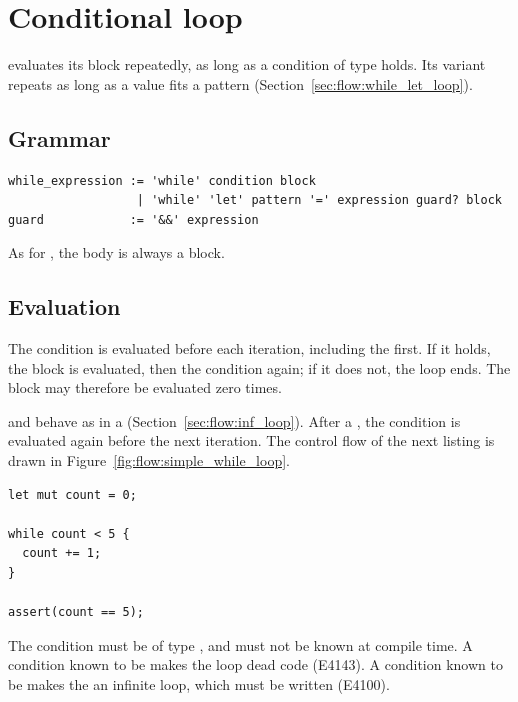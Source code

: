 \vfill%
\pagebreak
\section{Conditional loop}%
\label{sec:flow:while_loop}

 evaluates its block repeatedly, as long as a condition of type
 holds. Its variant  repeats as long as a value fits
a pattern (Section~\ref{sec:flow:while_let_loop}).

\subsection{Grammar}

\begin{lstlisting}[style=grammarVerb]
while_expression := 'while' condition block
                  | 'while' 'let' pattern '=' expression guard? block
guard            := '&&' expression
\end{lstlisting}

As for , the body is always a block.

\subsection{Evaluation}

The condition is evaluated before each iteration, including the first. If it
holds, the block is evaluated, then the condition again; if it does not, the loop
ends. The block may therefore be evaluated zero times.

 and  behave as in a 
(Section~\ref{sec:flow:inf_loop}). After a , the condition is
evaluated again before the next iteration. The control flow of the next listing
is drawn in Figure~\ref{fig:flow:simple_while_loop}.

\begin{lstlisting}[style=coloredverbatim, caption=Simple while loop, label=lst:flow:simple_while_loop]
let mut count = 0;

while count < 5 {
  count += 1;
}

assert(count == 5);
\end{lstlisting}



The condition must be of type , and must not be known at compile
time. A condition known to be  makes the loop dead code (E4143). A
condition known to be  makes the  an infinite loop,
which must be written  (E4100).


